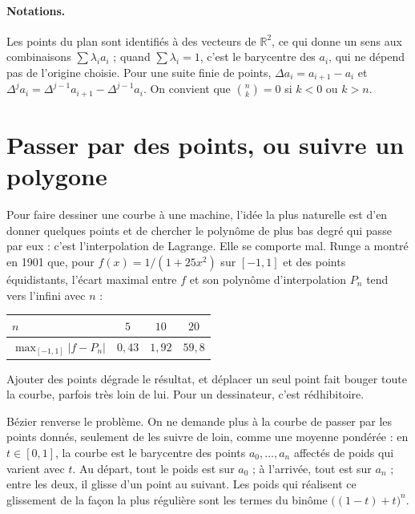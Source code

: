 \documentclass[11pt,a4paper]{article}
\theoremstyle{plain}
\theoremstyle{definition}
\theoremstyle{remark}
\newcommand{\R}{\mathbb{R}}
\begin{document}
\paragraph{Notations.} Les points du plan sont identifiés à des vecteurs de $\R^2$, ce qui donne un sens aux combinaisons $\sum\lambda_ia_i$ ; quand $\sum\lambda_i=1$, c'est le barycentre des $a_i$, qui ne dépend pas de l'origine choisie. Pour une suite finie de points, $\Delta a_i=a_{i+1}-a_i$ et $\Delta^ja_i=\Delta^{j-1}a_{i+1}-\Delta^{j-1}a_i$. On convient que $\binom nk=0$ si $k<0$ ou $k>n$.

\tableofcontents

\section{Passer par des points, ou suivre un polygone}

Pour faire dessiner une courbe à une machine, l'idée la plus naturelle est d'en donner quelques points et de chercher le polynôme de plus bas degré qui passe par eux : c'est l'interpolation de Lagrange. Elle se comporte mal. Runge a montré en 1901 que, pour $f(x)=1/(1+25x^2)$ sur $[-1,1]$ et des points équidistants, l'écart maximal entre $f$ et son polynôme d'interpolation $P_n$ tend vers l'infini avec $n$ :

\begin{center}
\begin{tabular}{@{}lccc@{}}
\toprule
$n$ & $5$ & $10$ & $20$ \\
\midrule
$\max_{[-1,1]}|f-P_n|$ & $0{,}43$ & $1{,}92$ & $59{,}8$ \\
\bottomrule
\end{tabular}
\end{center}

Ajouter des points dégrade le résultat, et déplacer un seul point fait bouger toute la courbe, parfois très loin de lui. Pour un dessinateur, c'est rédhibitoire.

Bézier renverse le problème. On ne demande plus à la courbe de passer par les points donnés, seulement de les suivre de loin, comme une moyenne pondérée : en $t\in[0,1]$, la courbe est le barycentre des points $a_0,\dots,a_n$ affectés de poids qui varient avec $t$. Au départ, tout le poids est sur $a_0$ ; à l'arrivée, tout est sur $a_n$ ; entre les deux, il glisse d'un point au suivant. Les poids qui réalisent ce glissement de la façon la plus régulière sont les termes du binôme $\big((1-t)+t\big)^n$.
\end{document}
